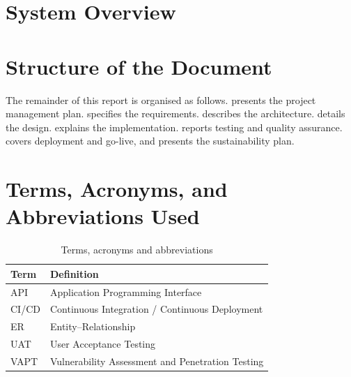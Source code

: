 \section{System Overview}

\section{Structure of the Document}
The remainder of this report is organised as follows.  presents the project management plan.
 specifies the requirements.  describes the architecture.
 details the design.  explains the implementation.
 reports testing and quality assurance.  covers deployment and go-live, and
 presents the sustainability plan.

\section{Terms, Acronyms, and Abbreviations Used}
\begin{table}[htbp]
\centering
\caption{Terms, acronyms and abbreviations}\label{tab:terms}
\begin{tabularx}{\textwidth}{@{}l X@{}}
\toprule
\textbf{Term} & \textbf{Definition}\\
\midrule
API   & Application Programming Interface\\
CI/CD & Continuous Integration / Continuous Deployment\\
ER    & Entity--Relationship\\
UAT   & User Acceptance Testing\\
VAPT  & Vulnerability Assessment and Penetration Testing\\
\bottomrule
\end{tabularx}
\end{table}
